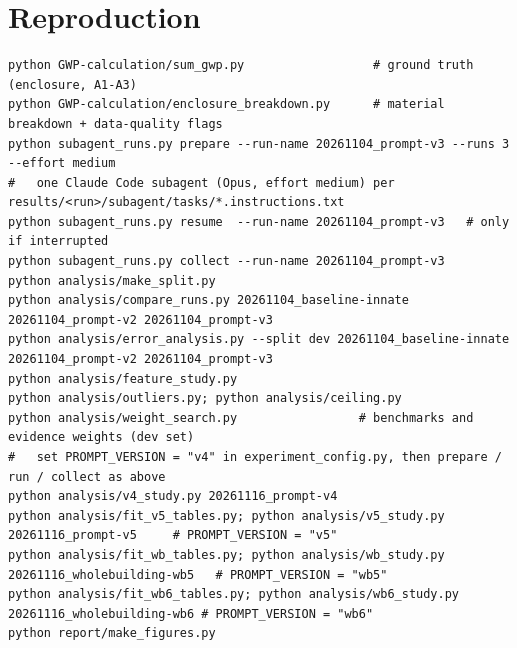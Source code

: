 \documentclass[10pt,letterpaper]{article}
\begin{document}
\section{Reproduction}
\begin{lstlisting}
python GWP-calculation/sum_gwp.py                  # ground truth (enclosure, A1-A3)
python GWP-calculation/enclosure_breakdown.py      # material breakdown + data-quality flags
python subagent_runs.py prepare --run-name 20261104_prompt-v3 --runs 3 --effort medium
#   one Claude Code subagent (Opus, effort medium) per results/<run>/subagent/tasks/*.instructions.txt
python subagent_runs.py resume  --run-name 20261104_prompt-v3   # only if interrupted
python subagent_runs.py collect --run-name 20261104_prompt-v3
python analysis/make_split.py
python analysis/compare_runs.py 20261104_baseline-innate 20261104_prompt-v2 20261104_prompt-v3
python analysis/error_analysis.py --split dev 20261104_baseline-innate 20261104_prompt-v2 20261104_prompt-v3
python analysis/feature_study.py
python analysis/outliers.py; python analysis/ceiling.py
python analysis/weight_search.py                 # benchmarks and evidence weights (dev set)
#   set PROMPT_VERSION = "v4" in experiment_config.py, then prepare / run / collect as above
python analysis/v4_study.py 20261116_prompt-v4
python analysis/fit_v5_tables.py; python analysis/v5_study.py 20261116_prompt-v5     # PROMPT_VERSION = "v5"
python analysis/fit_wb_tables.py; python analysis/wb_study.py 20261116_wholebuilding-wb5   # PROMPT_VERSION = "wb5"
python analysis/fit_wb6_tables.py; python analysis/wb6_study.py 20261116_wholebuilding-wb6 # PROMPT_VERSION = "wb6"
python report/make_figures.py
\end{lstlisting}
\end{document}
